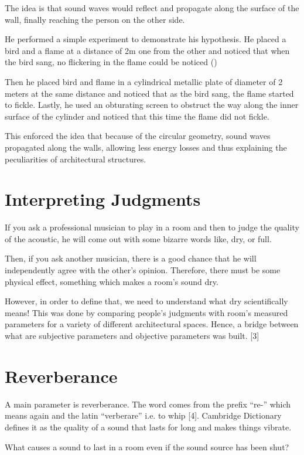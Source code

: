 \documentclass[draft ]{article}
\begin{document}
The idea is that sound waves would reflect and propagate along the surface of the wall, finally reaching the person on the other side.

He performed a simple experiment to demonstrate his hypothesis. He placed a bird and a flame at a distance of 2m one from the other and noticed that when the bird sang, no flickering in the flame could be noticed ()

Then he placed bird and flame in a cylindrical metallic plate of diameter of 2 meters at the same distance and noticed that as the bird sang, the flame started to fickle.
Lastly, he used an obturating screen to obstruct the way along the inner surface of the cylinder and noticed that this time the flame did not fickle. \cite{article:whispering}

This enforced the idea that because of the circular geometry, sound waves propagated along the walls, allowing less energy losses and thus explaining the peculiarities of architectural structures.

\section{Interpreting Judgments}
If you ask a professional musician to play in a room and then to judge the quality of the acoustic, he will come out with some bizarre words like, dry, or full.

Then, if you ask another musician, there is a good chance that he will independently agree with the other’s opinion. Therefore, there must be some physical effect, something which makes a room’s sound dry.

However, in order to define that, we need to understand what dry scientifically means! This was done by comparing people’s judgments with room’s measured parameters for a variety of different architectural spaces.
Hence, a bridge between what are subjective parameters and objective parameters was built. [3]

\section{Reverberance}
A main parameter is reverberance. The word comes from the prefix “re-” which means again and the latin “verberare” i.e. to whip [4]. Cambridge Dictionary defines it as the quality of a sound that lasts for long and makes things vibrate.

What causes a sound to last in a room even if the sound source has been shut?
\end{document}
